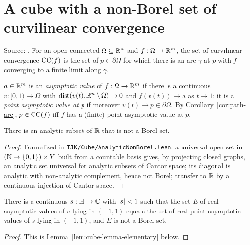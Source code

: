 \section{A cube with a non-Borel set of curvilinear convergence}\label{sec:cube}
Source: \cite{PAMS}. For an open connected $\Omega\subseteq\mathbb{R}^n$ and $f:\Omega\to\mathbb{R}^m$, the set of curvilinear convergence $\operatorname{CC}(f)$ is the set of
$p\in\partial\Omega$ for which there is an arc $\gamma$ at $p$ with $f$ converging to a finite limit along $\gamma$.

\begin{definition}\label{def:asymptotic}
$a\in\mathbb{R}^m$ is an \emph{asymptotic value} of $f:\Omega\to\mathbb{R}^m$ if there is a continuous $v:[0,1)\to\Omega$ with $\operatorname{dist}(v(t),\mathbb{R}^n\setminus\Omega)\to0$
and $f(v(t))\to a$ as $t\to1$; it is a \emph{point asymptotic value at $p$} if moreover $v(t)\to p\in\partial\Omega$. By
Corollary~\ref{cor:path-arc}, $p\in\operatorname{CC}(f)$ iff $f$ has a (finite) point asymptotic value at $p$.
\end{definition}

\begin{theorem}\label{fact:analytic-nonborel}
There is an analytic subset of $\mathbb{R}$ that is not a Borel set.
\end{theorem}
\begin{proof}Formalized in \texttt{TJK/Cube/AnalyticNonBorel.lean}: a universal open set in $(\mathbb{N}\to\{0,1\})\times Y$ built from a countable basis gives, by projecting closed graphs, an analytic set universal for analytic subsets of Cantor space; its diagonal is analytic with non-analytic complement, hence not Borel; transfer to $\mathbb{R}$ by a continuous injection of Cantor space.\end{proof}

\begin{lemma}\label{lem:cube-lemma}
There is a continuous $s:\mathbb{H}\to\mathbb{C}$ with $\lvert s\rvert<1$ such that the set $E$ of real asymptotic values of $s$ lying in $(-1,1)$ equals the set
of real point asymptotic values of $s$ lying in $(-1,1)$, and $E$ is not a Borel set.
\end{lemma}
\begin{proof}
This is Lemma~\ref{lem:cube-lemma-elementary} below.
\end{proof}

